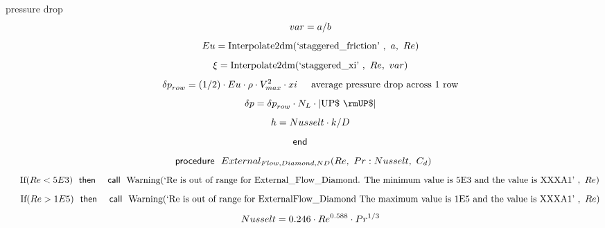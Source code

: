 \documentclass[10pt,fleqn]{article}
\newcommand{\F}[1]{\mbox{$#1$}}
\newcommand{\K}[1]{\mbox{\sf#1\ \ \mit}}
\newcommand{\KS}[1]{\mbox{\sf\ \ #1\ \ \mit}}
\newcommand{\SC}[1]{\mbox{`#1'}\  }
\newcommand{\V}[1]{\mbox{$ #1 $}}
\newcommand{\I}{\mbox{\hspace{0.20in}}}
\begin{document}
\vspace{0.10in}
\noindent
\rm pressure drop
\begin{equation}
\I \label{EES Eqn:290}
\V{var} =a/b 
\end{equation}
\begin{equation}
\I \label{EES Eqn:291}
\V{Eu} =\mbox{Interpolate2dm}{ \left( \SC{staggered\_friction},\ a,\ \V{Re}  \right) } 
\end{equation}
\begin{equation}
\I \label{EES Eqn:292}
\xi=\mbox{Interpolate2dm}{ \left( \SC{staggered\_xi},\ \V{Re} ,\ \V{var}  \right) } 
\end{equation}
\begin{equation}
\I \label{EES Eqn:293}
{\delta p}_{row}= \left( 1/2 \right) \cdot \V{Eu} \cdot \rho\cdot V_{max}^{2}\cdot xi	 
\mbox{\I average pressure drop across 1 row}
\end{equation}
\begin{equation}
\I \label{EES Eqn:294}
{\delta p}={\delta p}_{row}\cdot N_{L}\cdot \rm { \left|UP\$\ {\rmUP\$} \right|} 
\end{equation}
\begin{equation}
\I \label{EES Eqn:295}
h=\V{Nusselt} \cdot k/D 
\end{equation}
\begin{equation}
\label{EES Eqn:296}
\K{end} 
\end{equation}
\vspace{0.1 in}
\begin{equation}
\label{EES Eqn:297}
\K{procedure} \F{External_{Flow,Diamond,ND}}{ \left( \V{Re} ,\ \V{Pr} :\V{Nusselt} ,\ C_{d} \right) } 
\end{equation}
\begin{equation}
\I \label{EES Eqn:298}
\mbox{If}{ \left( \V{Re<5E3}  \right) } \KS{then} \KS{call} \mbox{Warning}{ \left( \SC{Re is out of range for External\_Flow\_Diamond.  The minimum value is 5E3 and the value is XXXA1},\ \V{Re}  \right) } 
\end{equation}
\begin{equation}
\I \label{EES Eqn:299}
\mbox{If}{ \left( \V{Re>1E5}  \right) } \KS{then} \KS{call} \mbox{Warning}{ \left( \SC{Re is out of range for ExternalFlow\_Diamond The maximum value is 1E5 and the value is XXXA1},\ \V{Re}  \right) } 
\end{equation}
\begin{equation}
\I \label{EES Eqn:300}
\V{Nusselt} =0.246\cdot \V{Re} ^{0.588}\cdot \V{Pr} ^{1/3} 
\end{equation}
\end{document}
